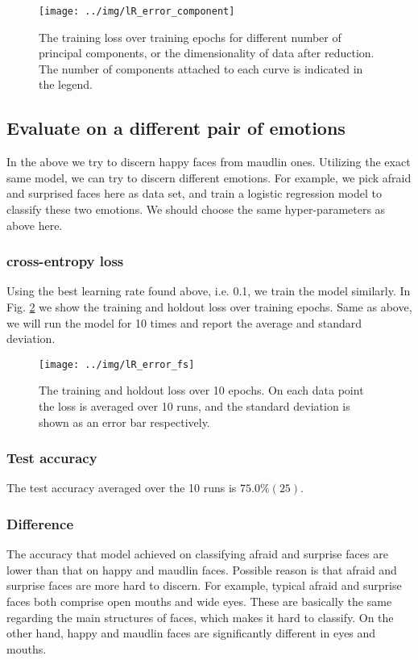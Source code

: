 \documentclass{article} %
\begin{document}
\begin{figure}[h]
\centering
\texttt{[image: ../img/lR\_error\_component]}
\caption{The training loss over training epochs for different number of principal components, or the dimensionality of data after reduction. The number of components attached to each curve is indicated in the legend.}
\label{fig:error_lr}
\end{figure}

\subsection{Evaluate on a different pair of emotions}
In the above we try to discern happy faces from maudlin ones. Utilizing the exact same model, we can try to discern different emotions. For example, we pick afraid and surprised faces here as data set, and train a logistic regression model to classify these two emotions. We should choose the same hyper-parameters as above here.

\subsubsection{cross-entropy loss}
Using the best learning rate found above, i.e. 0.1, we train the model similarly. In Fig. \ref{fig:error2} we show the training and holdout loss over training epochs. Same as above, we will run the model for 10 times and report the average and standard deviation. 

\begin{figure}[h]
\centering
\texttt{[image: ../img/lR\_error\_fs]}
\caption{The training and holdout loss over 10 epochs. On each data point the loss is averaged over 10 runs, and the standard deviation is shown as an error bar respectively.}
\label{fig:error2}
\end{figure}

\subsubsection{Test accuracy}
The test accuracy averaged over the 10 runs is $75.0 \% (25)$.

\subsubsection{Difference}
The accuracy that model achieved on classifying afraid and surprise faces are lower than that on happy and maudlin faces. Possible reason is that afraid and surprise faces are more hard to discern. For example, typical afraid and surprise faces both comprise open mouths and wide eyes. These are basically the same regarding the main structures of faces, which makes it hard to classify. On the other hand, happy and maudlin faces are significantly different in eyes and mouths.
\end{document}

